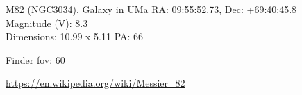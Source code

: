 \begin{block}{M82 (NGC3034), Galaxy in UMa}
    RA: 09:55:52.73, Dec: +69:40:45.8 \\ 
    Magnitude (V): 8.3 \\ 
    Dimensions: 10.99 x 5.11 PA: 66 

    Finder fov: 60 

    \url{https://en.wikipedia.org/wiki/Messier_82} 
\end{block}